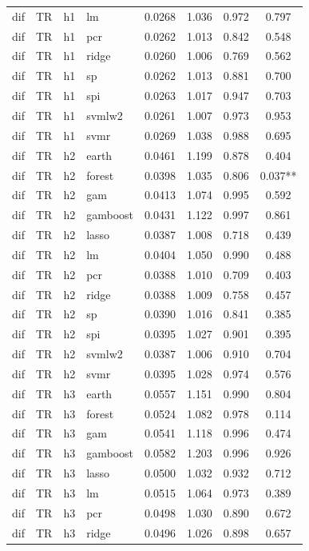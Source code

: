 \begin{ThreePartTable}
\begin{longtable}[t]{llclcccc}
dif & TR & h1 & lm & 0.0268 & 1.036 & 0.972 & 0.797\\
dif & TR & h1 & pcr & 0.0262 & 1.013 & 0.842 & 0.548\\
dif & TR & h1 & ridge & 0.0260 & 1.006 & 0.769 & 0.562\\
dif & TR & h1 & sp & 0.0262 & 1.013 & 0.881 & 0.700\\
dif & TR & h1 & spi & 0.0263 & 1.017 & 0.947 & 0.703\\
dif & TR & h1 & svmlw2 & 0.0261 & 1.007 & 0.973 & 0.953\\
dif & TR & h1 & svmr & 0.0269 & 1.038 & 0.988 & 0.695\\
\addlinespace
dif & TR & h2 & earth & 0.0461 & 1.199 & 0.878 & 0.404\\
dif & TR & h2 & forest & 0.0398 & 1.035 & 0.806 & 0.037**\\
dif & TR & h2 & gam & 0.0413 & 1.074 & 0.995 & 0.592\\
dif & TR & h2 & gamboost & 0.0431 & 1.122 & 0.997 & 0.861\\
dif & TR & h2 & lasso & 0.0387 & 1.008 & 0.718 & 0.439\\
dif & TR & h2 & lm & 0.0404 & 1.050 & 0.990 & 0.488\\
dif & TR & h2 & pcr & 0.0388 & 1.010 & 0.709 & 0.403\\
dif & TR & h2 & ridge & 0.0388 & 1.009 & 0.758 & 0.457\\
dif & TR & h2 & sp & 0.0390 & 1.016 & 0.841 & 0.385\\
dif & TR & h2 & spi & 0.0395 & 1.027 & 0.901 & 0.395\\
dif & TR & h2 & svmlw2 & 0.0387 & 1.006 & 0.910 & 0.704\\
dif & TR & h2 & svmr & 0.0395 & 1.028 & 0.974 & 0.576\\
\addlinespace
dif & TR & h3 & earth & 0.0557 & 1.151 & 0.990 & 0.804\\
dif & TR & h3 & forest & 0.0524 & 1.082 & 0.978 & 0.114\\
dif & TR & h3 & gam & 0.0541 & 1.118 & 0.996 & 0.474\\
dif & TR & h3 & gamboost & 0.0582 & 1.203 & 0.996 & 0.926\\
dif & TR & h3 & lasso & 0.0500 & 1.032 & 0.932 & 0.712\\
dif & TR & h3 & lm & 0.0515 & 1.064 & 0.973 & 0.389\\
dif & TR & h3 & pcr & 0.0498 & 1.030 & 0.890 & 0.672\\
dif & TR & h3 & ridge & 0.0496 & 1.026 & 0.898 & 0.657\\

\end{longtable}
\end{ThreePartTable}
